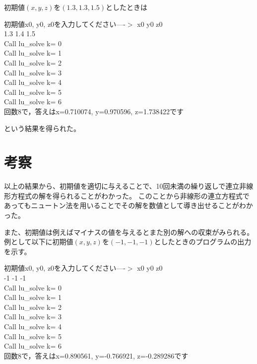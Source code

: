 \documentclass[a4paper,11pt]{jsarticle}
\begin{document}
初期値$(x,y,z)$を$(1.3,1.3,1.5)$としたときは
\newpage
\begin{shaded}
    \noindent
    初期値x0, y0, z0を入力してください----$>$ x0 y0 z0\\
    1.3 1.4 1.5\\
    Call lu\_solve k= 0\\
    Call lu\_solve k= 1\\
    Call lu\_solve k= 2\\
    Call lu\_solve k= 3\\
    Call lu\_solve k= 4\\
    Call lu\_solve k= 5\\
    Call lu\_solve k= 6\\
    回数8で，答えはx=0.710074, y=0.970596, z=1.738422です
\end{shaded}
という結果を得られた。

\section{考察}
以上の結果から、初期値を適切に与えることで、10回未満の繰り返しで連立非線形方程式の解を得られることがわかった。
このことから非線形の連立方程式であってもニュートン法を用いることでその解を数値として導き出せることがわかった。

また、初期値は例えばマイナスの値を与えるとまた別の解への収束がみられる。
例として以下に初期値$(x,y,z)$を$(-1,-1,-1)$としたときのプログラムの出力を示す。
\begin{shaded}
    \noindent
    初期値x0, y0, z0を入力してください----$>$ x0 y0 z0\\
    -1 -1 -1\\
    Call lu\_solve k= 0\\
    Call lu\_solve k= 1\\
    Call lu\_solve k= 2\\
    Call lu\_solve k= 3\\
    Call lu\_solve k= 4\\
    Call lu\_solve k= 5\\
    Call lu\_solve k= 6\\
    回数8で，答えはx=0.890561, y=-0.766921, z=-0.289286です
\end{shaded}
\end{document}
